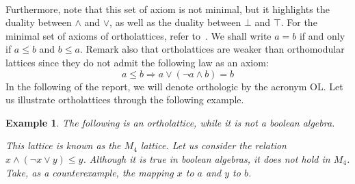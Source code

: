 \documentclass[a4paper, 11pt]{article}
\newtheorem{example}[theorem]{Example}
\begin{document}
    \\
    Furthermore, note that this set of axiom is not minimal, but it highlights the duality between 
    $\wedge$ and
    $\vee$, as well as the duality between $\bot$ and $\top$. For the minimal set of axioms of 
    ortholattices, refer to~\cite{MCCUNE1998285}. We shall write $a=b$ if and only if $a\leq b$ 
    and $b\leq a$. Remark also that ortholattices are weaker than orthomodular lattices since they do 
    not admit the following law as an axiom:
    \[
	    a\leq b\Rightarrow a\vee(\neg a\wedge b)=b
    \]
    In the following of the report, we will denote orthologic by the acronym OL. Let us illustrate
    ortholattices through the following example. 
    \begin{example}
	    \label{example1}
	    The following is an ortholattice, while it is not a boolean algebra.
	    \begin{center}
	    \end{center}
	    This lattice is known as the $M_4$ lattice. Let us consider the relation 
	    $x\wedge(\neg x\vee y)\leq y$. Although it is true in boolean algebras, it does not hold in 
	    $M_4$. Take, as a counterexample, the mapping $x$ to $a$ and $y$ to $b$.
    \end{example}
\end{document}

